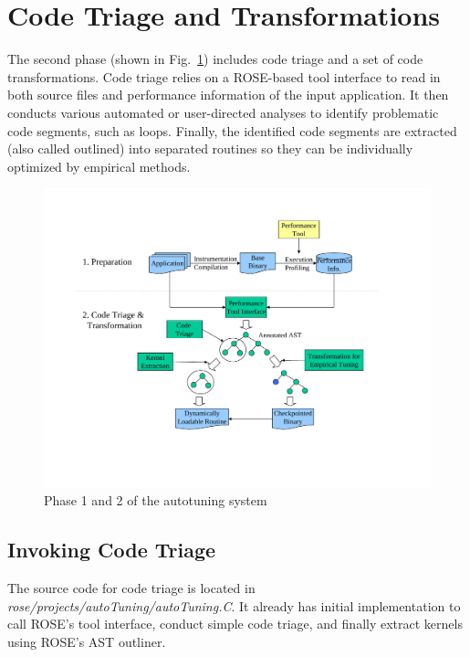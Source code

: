 \clearpage
\section{Code Triage and Transformations}
The second phase (shown in Fig.~\ref{fig:phase12}) includes code triage and a set of code transformations. 
Code triage relies on a ROSE-based tool interface to read in both source files and performance information of
the input application.
It then conducts various automated or user-directed analyses to identify
problematic code segments, such as loops. 
Finally, the identified code segments are extracted (also called outlined) into separated routines so they can be individually
optimized by empirical methods. 
\begin{figure}[htbp]
\vspace{5ex}
       \centering
               \includegraphics[width=1.2\textwidth]{phase12.pdf}
       \caption{Phase 1 and 2 of the autotuning system}
       \label{fig:phase12}
\end{figure}

\subsection{Invoking Code Triage}
The source code for code triage is located in
\textit{rose/projects/autoTuning/autoTuning.C}. 
It already has initial implementation to call ROSE's tool interface,
conduct simple code triage, and finally extract kernels using ROSE's AST
outliner. 

